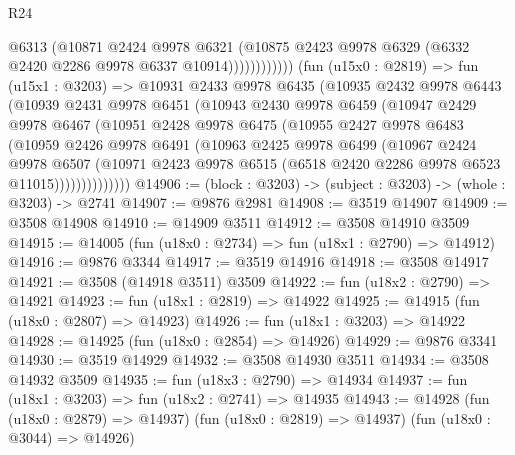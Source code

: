 \begin{lexlean}{R24}
\begin{coremodule}
                          @6313
                          (@10871
                            @2424
                            @9978
                            @6321
                            (@10875
                              @2423
                              @9978
                              @6329
                              (@6332 @2420 @2286 @9978 @6337 @10914))))))))))))
        (fun (u15x0 : @2819) =>
        fun (u15x1 : @3203) =>
        @10931
          @2433
          @9978
          @6435
          (@10935
            @2432
            @9978
            @6443
            (@10939
              @2431
              @9978
              @6451
              (@10943
                @2430
                @9978
                @6459
                (@10947
                  @2429
                  @9978
                  @6467
                  (@10951
                    @2428
                    @9978
                    @6475
                    (@10955
                      @2427
                      @9978
                      @6483
                      (@10959
                        @2426
                        @9978
                        @6491
                        (@10963
                          @2425
                          @9978
                          @6499
                          (@10967
                            @2424
                            @9978
                            @6507
                            (@10971
                              @2423
                              @9978
                              @6515
                              (@6518 @2420 @2286 @9978 @6523 @11015))))))))))))))
@14906 := (block : @3203) -> (subject : @3203) -> (whole : @3203) -> @2741
@14907 := @9876 @2981
@14908 := @3519 @14907
@14909 := @3508 @14908
@14910 := @14909 @3511
@14912 := @3508 @14910 @3509
@14915 := @14005 (fun (u18x0 : @2734) => fun (u18x1 : @2790) => @14912)
@14916 := @9876 @3344
@14917 := @3519 @14916
@14918 := @3508 @14917
@14921 := @3508 (@14918 @3511) @3509
@14922 := fun (u18x2 : @2790) => @14921
@14923 := fun (u18x1 : @2819) => @14922
@14925 := @14915 (fun (u18x0 : @2807) => @14923)
@14926 := fun (u18x1 : @3203) => @14922
@14928 := @14925 (fun (u18x0 : @2854) => @14926)
@14929 := @9876 @3341
@14930 := @3519 @14929
@14932 := @3508 @14930 @3511
@14934 := @3508 @14932 @3509
@14935 := fun (u18x3 : @2790) => @14934
@14937 := fun (u18x1 : @3203) => fun (u18x2 : @2741) => @14935
@14943 := @14928
    (fun (u18x0 : @2879) => @14937)
    (fun (u18x0 : @2819) => @14937)
    (fun (u18x0 : @3044) => @14926)

\end{coremodule}
\end{lexlean}
